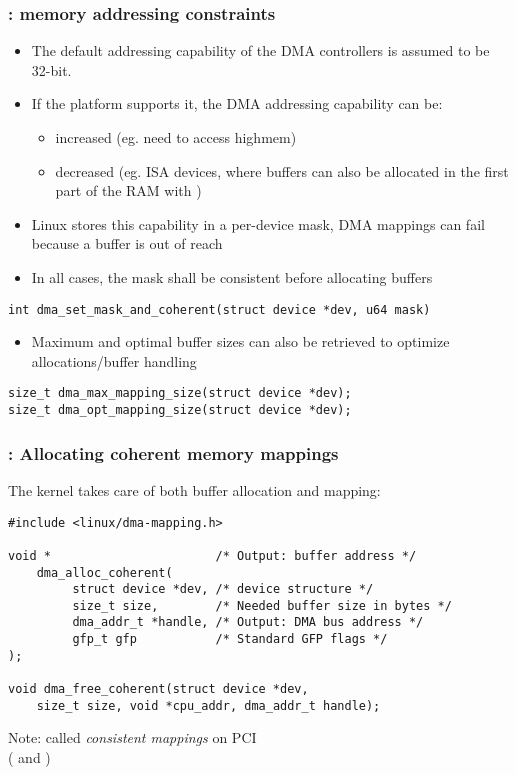 \begin{frame}[fragile]
  \frametitle{: memory addressing constraints}
  \begin{itemize}
  \item The default addressing capability of the DMA controllers is
    assumed to be 32-bit.
  \item If the platform supports it, the DMA addressing capability can be:
    \begin{itemize}
    \item increased (eg. need to access highmem)
    \item decreased (eg. ISA devices, where  buffers can
      also be allocated in the first part of the RAM with
      )
    \end{itemize}
  \item Linux stores this capability in a per-device mask, DMA mappings
    can fail because a buffer is out of reach
  \item In all cases, the  mask shall be consistent before
    allocating buffers
  \end{itemize}
\begin{verbatim}
int dma_set_mask_and_coherent(struct device *dev, u64 mask)
\end{verbatim}
  \begin{itemize}
  \item Maximum and optimal buffer sizes can also be retrieved to
    optimize allocations/buffer handling
  \end{itemize}
\begin{verbatim}
size_t dma_max_mapping_size(struct device *dev);
size_t dma_opt_mapping_size(struct device *dev);
\end{verbatim}
\end{frame}

\begin{frame}[fragile]
  \frametitle{: Allocating coherent memory mappings}
  The kernel takes care of both buffer allocation and mapping:
\begin{verbatim}
#include <linux/dma-mapping.h>

void *                       /* Output: buffer address */
    dma_alloc_coherent(
         struct device *dev, /* device structure */
         size_t size,        /* Needed buffer size in bytes */
         dma_addr_t *handle, /* Output: DMA bus address */
         gfp_t gfp           /* Standard GFP flags */
);

void dma_free_coherent(struct device *dev,
    size_t size, void *cpu_addr, dma_addr_t handle);
\end{verbatim}
Note: called {\em consistent mappings} on PCI\\
( and )
\end{frame}

